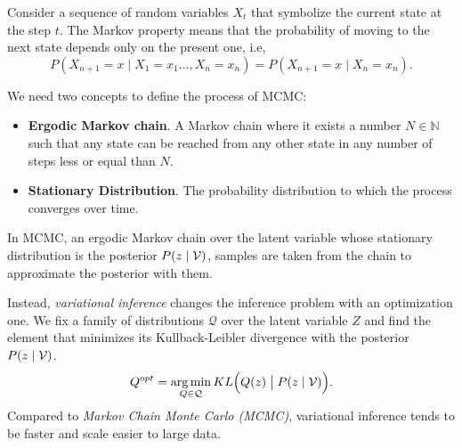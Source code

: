 \begin{center}
\end{center}

Consider a sequence of random variables \(X_{t}\) that symbolize the current state at the step \(t\). The Markov property means that the probability of moving to the next state depends only on the present one, i.e,
\[
  P(X_{n+1} = x \mid X_{1} = x_{1} \dots, X_{n} = x_{n}) = P(X_{n+1} = x \mid X_{n} = x_{n}).
\]

We need two concepts to define the process of MCMC:
\begin{itemize}
  \item \textbf{Ergodic Markov chain}. A Markov chain where it exists a number \(N \in \mathbb{N}\) such that any state can be reached from any other state in any number of steps less or equal than \(N\).
  \item \textbf{Stationary Distribution}. The probability distribution to which the process converges over time.
\end{itemize}

In MCMC, an ergodic Markov chain over the latent variable whose stationary distribution is the posterior \(P(z \mid \mathcal{V})\), samples are taken from the chain to approximate the posterior with them.

Instead, \emph{variational inference} changes the inference problem with an optimization one. We fix a family of distributions \(\mathcal{Q}\) over the latent variable \(Z\) and find the element that minimizes its Kullback-Leibler divergence with the posterior \(P(z \mid \mathcal{V})\).
\[
  Q^{opt} = \operatorname*{arg\,min}_{Q \in \mathcal{Q}} KL\Big(Q(z) \bigm| P(z \mid \mathcal{V})\Big).
\]
Compared to \emph{Markov Chain Monte Carlo (MCMC)}, variational inference tends to be faster and scale easier to large data.

